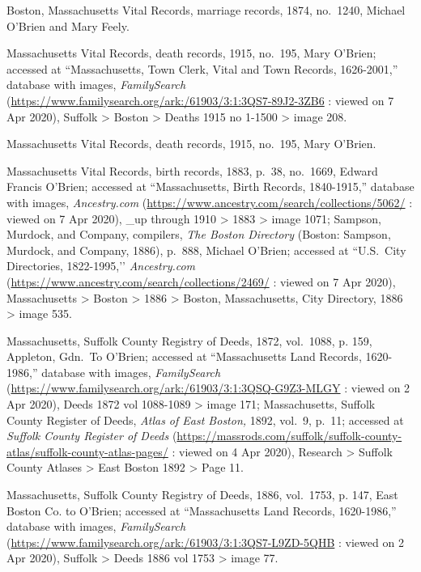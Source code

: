 \begin{thebibliography}{999}
Boston, Massachusetts Vital Records, marriage records, 1874, no.\ 1240, Michael O'Brien and Mary Feely.

Massachusetts Vital Records, death records, 1915, no.\ 195, Mary O'Brien; accessed at ``Massachusetts, Town Clerk, Vital and Town Records, 1626-2001,'' database with images, \textit{FamilySearch} (\url{https://www.familysearch.org/ark:/61903/3:1:3QS7-89J2-3ZB6} : viewed on 7 Apr 2020), Suffolk > Boston > Deaths 1915 no 1-1500 > image 208.

Massachusetts Vital Records, death records, 1915, no.\ 195, Mary O'Brien.

Massachusetts Vital Records, birth records, 1883, p.\ 38, no.\ 1669, Edward Francis O'Brien; accessed at ``Massachusetts, Birth Records, 1840-1915,'' database with images, \textit{Ancestry.com} (\url{https://www.ancestry.com/search/collections/5062/} : viewed on 7 Apr 2020), \_up through 1910 > 1883 > image 1071; Sampson, Murdock, and Company, compilers, \textit{The Boston Directory} (Boston: Sampson, Murdock, and Company, 1886), p.\ 888, Michael O'Brien; accessed at ``U.S.\ City Directories, 1822-1995,’’ \textit{Ancestry.com} (\url{https://www.ancestry.com/search/collections/2469/} : viewed on 7 Apr 2020), Massachusetts > Boston > 1886 > Boston, Massachusetts, City Directory, 1886 > image 535.

Massachusetts, Suffolk County Registry of Deeds, 1872, vol.\ 1088, p. 159, Appleton, Gdn.\ To O’Brien; accessed at ``Massachusetts Land Records, 1620-1986,'' database with images, \textit{FamilySearch} (\url{https://www.familysearch.org/ark:/61903/3:1:3QSQ-G9Z3-MLGY} : viewed on 2 Apr 2020), Deeds 1872 vol 1088-1089 > image 171; Massachusetts, Suffolk County Register of Deeds, \textit{Atlas of East Boston,} 1892, vol.\ 9, p.\ 11; accessed at \textit{Suffolk County Register of Deeds} (\url{https://massrods.com/suffolk/suffolk-county-atlas/suffolk-county-atlas-pages/} : viewed on 4 Apr 2020), Research > Suffolk County Atlases > East Boston 1892 > Page 11.

Massachusetts, Suffolk County Registry of Deeds, 1886, vol.\ 1753, p. 147, East Boston Co. to O’Brien; accessed at ``Massachusetts Land Records, 1620-1986,'' database with images, \textit{FamilySearch} (\url{https://www.familysearch.org/ark:/61903/3:1:3QS7-L9ZD-5QHB} : viewed on 2 Apr 2020), Suffolk > Deeds 1886 vol 1753 > image 77.


\end{thebibliography}
